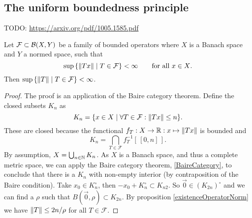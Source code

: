 \subsection{The uniform boundedness principle}
TODO: \url{https://arxiv.org/pdf/1005.1585.pdf}

\begin{theorem} \label{uniformBoundednessPrinciple}
Let $\mathcal{F}\subset \operatorname{\mathcal{B}}(X,Y)$ be a family of bounded operators where $X$ is a Banach space and $Y$ a normed space, such that
\[ \sup\setbuilder{\norm{Tx}}{T\in\mathcal{F}} < \infty \qquad \text{for all $x\in X$}. \]
Then $\sup\setbuilder{\norm{T}}{T\in\mathcal{F}} < \infty$.
\end{theorem}
\begin{proof}
The proof is an application of the Baire category theorem. Define the closed subsets $K_n$ as
\[ K_n = \setbuilder{x\in X}{\forall T\in\mathcal{F}: \norm{Tx}\leq n}. \]
These are closed because the functional $f_T: X\to \mathbb{R}: x\mapsto \lVert Tx\rVert$ is bounded and
\[ K_n = \bigcap_{T\in\mathcal{F}}f_T^{-1}[\,[0,n]\,]. \]
By assumption, $X=\bigcup_{n\in\mathbb{N}} K_n$. As $X$ is a Banach space, and thus a complete metric space, we can apply the Baire category theorem, \ref{BaireCategory}, to conclude that there is a $K_n$ with non-empty interior (by contraposition of the Baire condition). Take $x_0\in K_n^\circ$, then $-x_0+K_n^\circ \subset K_{n2}$. So $\vec{0}\in (K_{2n})^\circ$ and we can find a $\rho$ such that $B(\vec{0},\rho)\subset K_{2n}$. By proposition \ref{existenceOperatorNorm} we have $\lVert T\rVert\leq 2n/\rho$ for all $T\in\mathcal{F}$.
\end{proof}

